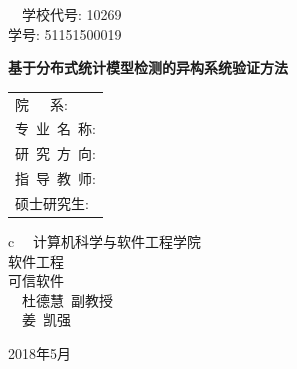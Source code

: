 \pagestyle{empty}

\hskip 4.75cm {{ ~~学校代号: {\large 10269}}}\\
\hspace*{\fill} {{ 学号: {\large 51151500019}}}

\vskip 2cm

\begin{center}
\end{center}

\vskip 3cm

\begin{center}
{\bf 基于分布式统计模型检测的异构系统验证方法}
\end{center}

\vskip 3cm {\Large
\begin{center}
\begin{tabular}{l}
院\qquad\ \ \ 系:\\
专~业~名~称:\\
研~究~方~向:\\
指~导~教~师:\\
硕士研究生:
\end{tabular}
\begin{tabular}c
~~计算机科学与软件工程学院 \\
\hline  软件工程 \\
\hline  可信软件  \\
\hline ~~杜德慧\  副教授  \\
\hline ~~姜\ 凯强\   \\
\hline
\end{tabular}
\end{center}}

\vskip 30mm

\begin{center}
{\Large 2018年5月}
\end{center}
